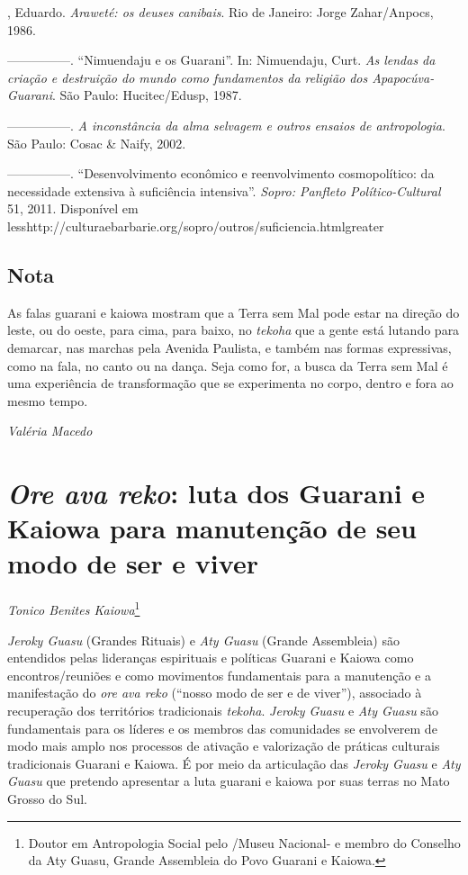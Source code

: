 \begin{Parskip}
, Eduardo. \emph{Araweté: os deuses canibais}. Rio de
Janeiro: Jorge Zahar/Anpocs, 1986.

—————. ``Nimuendaju e os Guarani''. In: Nimuendaju, Curt. \emph{As lendas
da criação e destruição do mundo como fundamentos da religião dos
Apapocúva-Guarani}. São Paulo: Hucitec/Edusp, 1987.

—————. \emph{A inconstância da alma selvagem e outros ensaios de
antropologia}. São Paulo: Cosac \& Naify, 2002.

—————. ``Desenvolvimento econômico e reenvolvimento cosmopolítico:
da necessidade extensiva à suficiência intensiva''. \emph{Sopro: Panfleto
Político-Cultural} 51, 2011. Disponível em
{less}http://culturaebarbarie.org/sopro/outros/suficiencia.html{greater}
\end{Parskip}

\section{Nota}
As falas guarani e kaiowa mostram que a Terra sem Mal pode estar na
direção do leste, ou do oeste, para cima, para baixo, no \emph{tekoha} que a
gente está lutando para demarcar, nas marchas pela Avenida Paulista, e
também nas formas expressivas, como na fala, no canto ou na dança. Seja
como for, a busca da Terra sem Mal é uma experiência de transformação
que se experimenta no corpo, dentro e fora ao mesmo tempo.
\medskip
\begin{flushright}
\emph{Valéria Macedo}
\end{flushright}

\chapter{\emph{Ore ava reko}: luta dos Guarani e Kaiowa para
manutenção de seu modo de ser e viver}

\begin{flushright}
\emph{Tonico Benites Kaiowa}\footnote{Doutor em Antropologia Social pelo
/Museu Nacional- e membro do Conselho da Aty Guasu, Grande
Assembleia do Povo Guarani e Kaiowa.}
\end{flushright}
\bigskip

\emph{Jeroky Guasu} (Grandes Rituais) e \emph{Aty Guasu} (Grande Assembleia) são
entendidos pelas lideranças espirituais e políticas Guarani e Kaiowa
como encontros/reuniões e como movimentos fundamentais para a
manutenção e a manifestação do \emph{ore ava reko} (``nosso modo de ser e de
viver''), associado à recuperação dos territórios tradicionais \emph{tekoha}.
\emph{Jeroky Guasu} e \emph{Aty Guasu} são fundamentais para os líderes e os membros
das comunidades se envolverem de modo mais amplo nos processos de
ativação e valorização de práticas culturais tradicionais Guarani e
Kaiowa. É por meio da articulação das \emph{Jeroky Guasu} e \emph{Aty Guasu} que
pretendo apresentar a luta guarani e kaiowa por suas terras no Mato
Grosso do Sul. 

